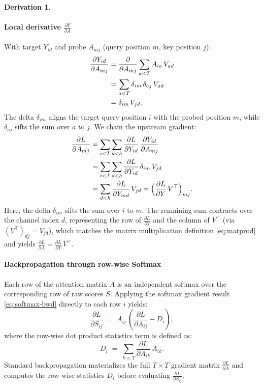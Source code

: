 \documentclass[letterpaper, 10 pt, conference]{ieeeconf}
\newcommand{\pdv}[2]{\frac{\partial #1}{\partial #2}}
\newcommand{\dL}[1]{\pdv{L}{#1}}
\newcommand{\kron}[2]{\delta_{#1 #2}}
\theoremstyle{definition}
\newtheorem*{derivation}{Derivation}
\begin{document}
\begin{derivation}
  \paragraph{Local derivative $\pdv{Y}{A}$}
  With target $Y_{id}$ and probe $A_{mj}$ (query position $m$, key position $j$):
  \begin{align}
    \pdv{Y_{id}}{A_{mj}}
     & = \pdv{}{A_{mj}} \sum_{a<T} A_{ia}\,V_{ad} \notag    \\
     & = \sum_{a<T} \kron{i}{m}\,\kron{a}{j}\,V_{ad} \notag \\
     & = \kron{i}{m}\,V_{jd}.
    \label{eq:att-dyda}
  \end{align}
  The delta $\kron{i}{m}$ aligns the target query position $i$ with the probed position $m$, while $\kron{a}{j}$ sifts the sum over $a$ to $j$. We chain the upstream gradient:
  \begin{align}
    \dL{A_{mj}}
     & = \sum_{i<T} \sum_{d<h} \dL{Y_{id}}\,\pdv{Y_{id}}{A_{mj}} \notag \\
     & = \sum_{i<T} \sum_{d<h} \dL{Y_{id}}\,\kron{i}{m}\,V_{jd} \notag  \\
     & = \sum_{d<h} \dL{Y_{md}}\,V_{jd}
    = \Bigl( \dL{Y}\,V^{\top} \Bigr)_{mj}.
    \label{eq:att-chain-da}
  \end{align}
  Here, the delta $\kron{i}{m}$ sifts the sum over $i$ to $m$. The remaining sum contracts over the channel index $d$, representing the row of $\dL{Y}$ and the column of $V^{\top}$ (via $(V^{\top})_{dj} = V_{jd}$), which matches the matrix multiplication definition \eqref{eq:matprod} and yields $\dL{A} = \dL{Y}\,V^{\top}$.

  \paragraph{Backpropagation through row-wise Softmax}
  Each row of the attention matrix $A$ is an independent softmax over the corresponding row of raw scores $S$. Applying the softmax gradient result \eqref{eq:softmax-bwd} directly to each row $i$ yields:
  \begin{equation}
    \dL{S_{ij}} \;=\; A_{ij}\,\left( \dL{A_{ij}} - D_i \right),
    \label{eq:att-ds-local}
  \end{equation}
  where the row-wise dot product statistics term is defined as:
  \begin{equation}
    D_i \;=\; \sum_{k<T} \dL{A_{ik}}\,A_{ik}.
    \label{eq:att-di-def}
  \end{equation}
  Standard backpropagation materializes the full $T \times T$ gradient matrix $\dL{A}$ and computes the row-wise statistics $D_i$ before evaluating $\dL{S_{ij}}$.


\end{derivation}
\end{document}
